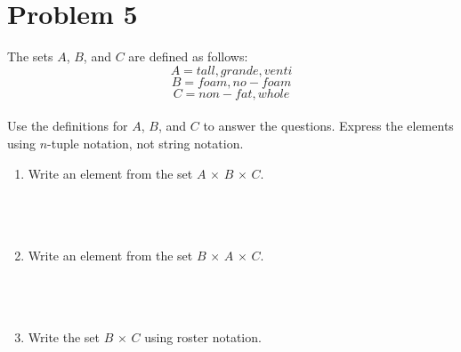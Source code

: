 \documentclass{amsart}
\theoremstyle{definition}
\theoremstyle{Exercise}
\theoremstyle{remark}
\theoremstyle{rule}
\numberwithin{equation}{section}
\begin{document}
 \newpage


\section*{Problem 5}
The sets $A$, $B$, and $C$ are defined as follows:\\

\[A = {tall, grande, venti}\]
\[B = {foam, no-foam}\]
\[C = {non-fat, whole}\]\\
Use the definitions for $A$, $B$, and $C$ to answer the questions. Express the elements using $n$-tuple notation, not string notation.\\
\begin{enumerate}[label=(\alph*)]
  \item Write an element from the set $A\, \times \,B \, \times \,C$.\\\\
\\\\
  \item Write an element from the set $B\, \times \,A \, \times \,C$.\\\\
\\\\
  \item Write the set $B \, \times \,C$ using roster notation.\\\\
\\\\
\end{enumerate}
\end{document}

